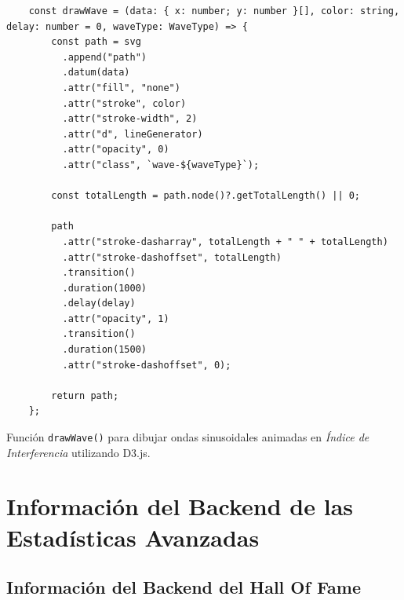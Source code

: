 \begin{ifalgorithm}[H]
  \begin{lstlisting}
    const drawWave = (data: { x: number; y: number }[], color: string, delay: number = 0, waveType: WaveType) => {
        const path = svg
          .append("path")
          .datum(data)
          .attr("fill", "none")
          .attr("stroke", color)
          .attr("stroke-width", 2)
          .attr("d", lineGenerator)
          .attr("opacity", 0)
          .attr("class", `wave-${waveType}`);

        const totalLength = path.node()?.getTotalLength() || 0;

        path
          .attr("stroke-dasharray", totalLength + " " + totalLength)
          .attr("stroke-dashoffset", totalLength)
          .transition()
          .duration(1000)
          .delay(delay)
          .attr("opacity", 1)
          .transition()
          .duration(1500)
          .attr("stroke-dashoffset", 0);

        return path;
    };
    \end{lstlisting}
  \caption{Función \texttt{drawWave()} para dibujar ondas sinusoidales animadas en \textit{Índice de Interferencia} utilizando D3.js.}
  \label{alg:draw_wave}
\end{ifalgorithm}



\chapter{Información del Backend de las Estadísticas Avanzadas} \label{ch:anexoD}

\section{Información del Backend del Hall Of Fame} \label{sec:backend_hall_of_fame}

